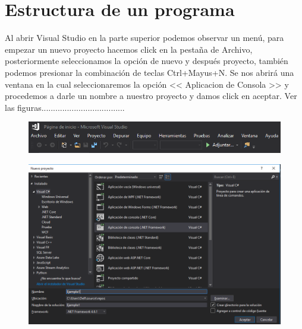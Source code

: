 \documentclass[12pt,a4paper]{report}
\begin{document}
\section{Estructura de un programa}
Al abrir Visual Studio en la parte superior podemos observar un menú, para empezar un nuevo proyecto hacemos click en la pestaña de Archivo, posteriormente seleccionamos la opción de nuevo y después proyecto, también podemos presionar la combinación de teclas Ctrl+Mayus+N. Se nos abrirá una ventana en la cual seleccionaremos la opción << Aplicacion de Consola >> y procedemos a darle un nombre a nuestro proyecto y damos click en aceptar. Ver las figuras....................................
\begin{figure}[hbtp]
\centering
\includegraphics[width=16cm]{Csh_Imagenes/Menu_sup.png}
\caption{}
\end{figure}
\begin{figure}[hbtp]
\centering
\includegraphics[width=16cm]{Csh_Imagenes/ConsoleApp.png}
\caption{}
\end{figure}
\end{document}

